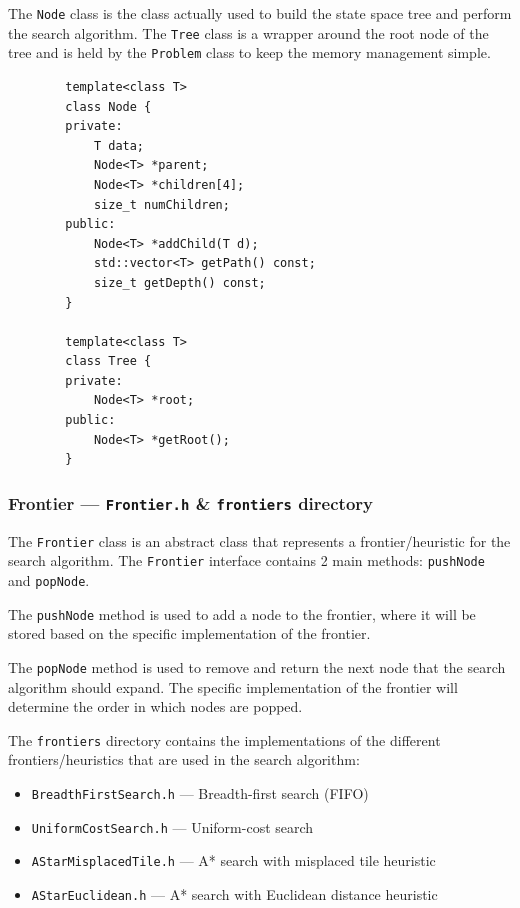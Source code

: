 \documentclass[12pt, english]{article}
\begin{document}
    The \lstinline|Node| class is the class actually used to build the state space tree
    and perform the search algorithm. The \lstinline|Tree| class is a wrapper around the
    root node of the tree and is held by the \lstinline|Problem| class to keep the memory
    management simple.

    \begin{lstlisting}
        template<class T>
        class Node {
        private:
            T data;
            Node<T> *parent;
            Node<T> *children[4];
            size_t numChildren;
        public:
            Node<T> *addChild(T d);
            std::vector<T> getPath() const;
            size_t getDepth() const;
        }

        template<class T>
        class Tree {
        private:
            Node<T> *root;
        public:
            Node<T> *getRoot();
        }
    \end{lstlisting}

    \subsubsection{Frontier --- \texttt{Frontier.h} \& \texttt{frontiers} directory}
    The \lstinline|Frontier| class is an abstract class that represents a 
    frontier/heuristic for the search algorithm. The \lstinline|Frontier| interface
    contains 2 main methods: \lstinline|pushNode| and \lstinline|popNode|.

    The \lstinline|pushNode| method is used to add a node to the frontier, where
    it will be stored based on the specific implementation of the frontier.
    
    The \lstinline|popNode| method is used to remove and return the next node that
    the search algorithm should expand. The specific implementation of the frontier
    will determine the order in which nodes are popped.

    The \lstinline|frontiers| directory contains the implementations of the different
    frontiers/heuristics that are used in the search algorithm:
    \begin{itemize}
        \item \texttt{BreadthFirstSearch.h} --- Breadth-first search (FIFO)
        \item \texttt{UniformCostSearch.h} --- Uniform-cost search
        \item \texttt{AStarMisplacedTile.h} --- A* search with misplaced tile heuristic
        \item \texttt{AStarEuclidean.h} --- A* search with Euclidean distance heuristic
    \end{itemize}
\end{document}
